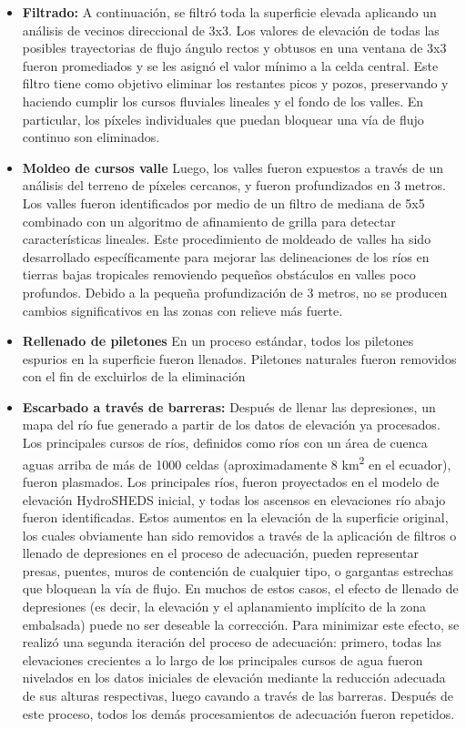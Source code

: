 \documentclass[10pt,a4paper, twoside]{report}
\begin{document}
\begin{itemize}
	\item \textbf{Filtrado:} A continuación, se filtró toda la superficie elevada aplicando un análisis de vecinos direccional de 3x3. Los valores de elevación de todas las posibles trayectorias de flujo ángulo rectos y obtusos en una ventana de 3x3 fueron promediados y se les asignó el valor mínimo a la celda central. Este filtro tiene como objetivo eliminar los restantes picos y pozos, preservando y haciendo cumplir los cursos fluviales lineales y el fondo de los valles. En particular, los píxeles individuales que puedan bloquear una vía de flujo continuo son eliminados.
	\item \textbf{Moldeo de cursos valle} Luego, los valles fueron expuestos a través de un análisis del terreno de píxeles cercanos, y fueron profundizados en 3 metros. Los valles fueron identificados por medio de un filtro de mediana de 5x5 combinado con un algoritmo de afinamiento de grilla para detectar características lineales. Este procedimiento de moldeado de valles ha sido desarrollado específicamente para mejorar las delineaciones de los ríos en tierras bajas tropicales removiendo pequeños obstáculos en valles poco profundos. Debido a la pequeña profundización de 3 metros, no se producen cambios significativos en las zonas con relieve más fuerte.
	\item \textbf{Rellenado de piletones}
	En un proceso estándar, todos los piletones espurios en la superficie fueron llenados. Piletones naturales fueron removidos con el fin de excluirlos de la eliminación	
	\item \textbf{Escarbado a través de barreras:} Después de llenar las depresiones, un mapa del río fue generado a partir de los datos de elevación ya procesados. Los principales cursos de ríos, definidos como ríos con un área de cuenca aguas arriba de más de 1000 celdas (aproximadamente 8 km\textsuperscript{2} en el ecuador), fueron plasmados. Los principales ríos, fueron proyectados en el modelo de elevación HydroSHEDS inicial, y todas los ascensos en elevaciones río abajo fueron identificadas. Estos aumentos en la elevación de la superficie original, los cuales obviamente han sido removidos a través de la aplicación de filtros o llenado de depresiones en el proceso de adecuación, pueden representar presas, puentes, muros de contención de cualquier tipo, o gargantas estrechas que bloquean la vía de flujo. En muchos de estos casos, el efecto de llenado de depresiones (es decir, la elevación y el aplanamiento implícito de la zona embalsada) puede no ser deseable la corrección. Para minimizar este efecto, se realizó una segunda iteración del proceso de adecuación: primero, todas las elevaciones crecientes a lo largo de los principales cursos de agua fueron nivelados en los datos iniciales de elevación mediante la reducción adecuada de sus alturas respectivas, luego cavando a través de las barreras. Después de este proceso, todos los demás procesamientos de adecuación fueron repetidos.
	

\end{itemize}
\end{document}
